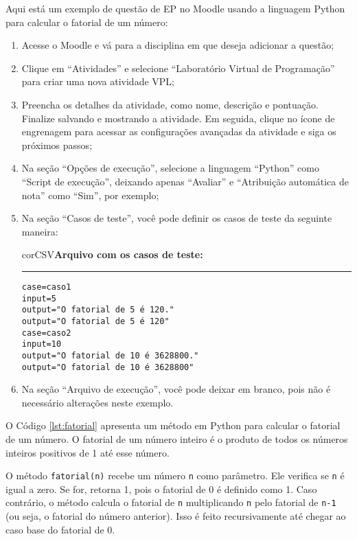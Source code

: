 Aqui está um exemplo de  questão de EP no Moodle usando a linguagem Python para calcular o fatorial de um número:
\begin{enumerate}
    \item Acesse o Moodle e vá para a disciplina em que deseja adicionar a questão;
    \item Clique em ``Atividades'' e selecione ``Laboratório Virtual de Programação''  para criar uma nova atividade VPL;

    \item Preencha os detalhes da atividade, como nome, descrição e pontuação. Finalize salvando e mostrando a atividade. Em seguida, clique no ícone de engrenagem para acessar as configurações avançadas da atividade e siga os próximos passos;

    \item Na seção ``Opções de execução'', selecione a linguagem ``Python'' como ``Script de execução'', deixando apenas ``Avaliar'' e ``Atribuição automática de nota'' como ``Sim'', por exemplo;

    \item Na seção ``Casos de teste'', você pode definir os casos de teste da seguinte maneira:

\begin{myboxCode}{corCSV}{\textbf{Arquivo com os casos de teste:}}\vspace{3mm}
\hrule
\begin{verbatim}
case=caso1
input=5
output="O fatorial de 5 é 120."
output="O fatorial de 5 é 120"
case=caso2
input=10
output="O fatorial de 10 é 3628800."
output="O fatorial de 10 é 3628800"
\end{verbatim}
\end{myboxCode}

    \item Na seção ``Arquivo de execução'', você pode deixar em branco, pois não é necessário alterações neste exemplo.

\end{enumerate}

O Código \ref{lst:fatorial} apresenta um método em Python para calcular o fatorial de um número. O fatorial de um número inteiro é o produto de todos os números inteiros positivos de 1 até esse número.

O método \verb|fatorial(n)| recebe um número \verb|n| como parâmetro. Ele verifica se \verb|n| é igual a zero. Se for, retorna 1, pois o fatorial de 0 é definido como 1. Caso contrário, o método calcula o fatorial de \verb|n| multiplicando \verb|n| pelo fatorial de \verb|n-1| (ou seja, o fatorial do número anterior). Isso é feito recursivamente até chegar ao caso base do fatorial de 0.

